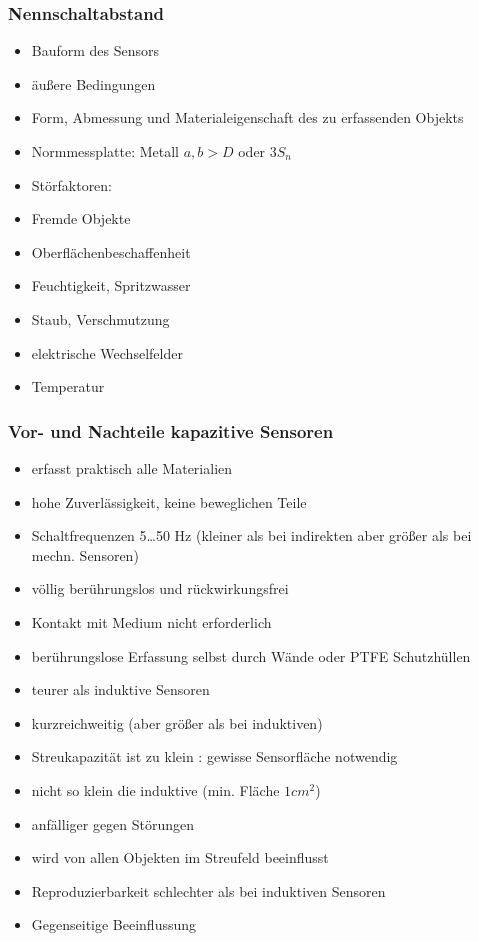 \documentclass[a4paper]{scrartcl}
\begin{document}
\subsubsection{Nennschaltabstand}
\begin{itemize}
\item Bauform des Sensors
\item äußere Bedingungen
\item Form, Abmessung und Materialeigenschaft des zu erfassenden Objekts
\item Normmessplatte: Metall $a,b > D$ oder $3S_n$
\item Störfaktoren:
\item Fremde Objekte
\item Oberflächenbeschaffenheit
\item Feuchtigkeit, Spritzwasser
\item Staub, Verschmutzung
\item elektrische Wechselfelder
\item Temperatur
\end{itemize}

\subsubsection{Vor- und Nachteile kapazitive Sensoren}
\begin{itemize}
\item erfasst praktisch alle Materialien
\item hohe Zuverlässigkeit, keine beweglichen Teile
\item Schaltfrequenzen 5\dots 50 Hz (kleiner als bei indirekten aber größer als bei mechn. Sensoren)
\item völlig berührungslos und rückwirkungsfrei
\item Kontakt mit Medium nicht erforderlich
\item berührungslose Erfassung selbst durch Wände oder PTFE Schutzhüllen
\item teurer als induktive Sensoren
\item kurzreichweitig (aber größer als bei induktiven)
\item Streukapazität ist zu klein : gewisse Sensorfläche notwendig
\item nicht so klein die induktive (min. Fläche $1 cm^2$)
\item anfälliger gegen Störungen
\item wird von allen Objekten im Streufeld beeinflusst
\item Reproduzierbarkeit schlechter als bei induktiven Sensoren
\item Gegenseitige Beeinflussung
\end{itemize}
\end{document}
